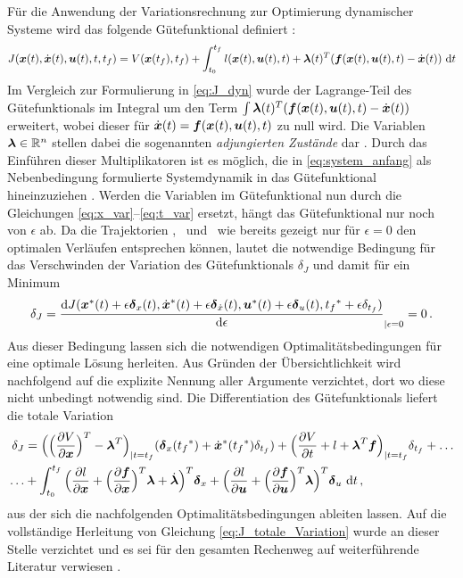 Für die Anwendung der Variationsrechnung zur Optimierung dynamischer Systeme wird das folgende Gütefunktional definiert \cite{KnutGraichen.2012}:
\begin{equation}
J(\boldsymbol{x}(t),\dot{\boldsymbol{x}}(t),\boldsymbol{u}(t),t,t_f) = V(\boldsymbol{x}(t_f),t_f) + \int_{t_0}^{t_f}l(\boldsymbol{x}(t),\boldsymbol{u}(t),t) + \boldsymbol{\lambda}(t)^T(\boldsymbol{f}(\boldsymbol{x}(t),\boldsymbol{u}(t),t) - \dot{\boldsymbol{x}}(t))~\textrm{d}{t} \label{eq:J_var_sys}
\end{equation}
Im Vergleich zur Formulierung in \eqref{eq:J_dyn} wurde der Lagrange-Teil des Gütefunktionals im Integral um den Term $\int\boldsymbol{\lambda}(t)^T(\boldsymbol{f}(\boldsymbol{x}(t),\boldsymbol{u}(t),t) - \dot{\boldsymbol{x}}(t))$ erweitert, wobei dieser für $\dot{\boldsymbol{x}}(t) = \boldsymbol{f}(\boldsymbol{x}(t),\boldsymbol{u}(t),t)$ zu null wird. Die Variablen $\boldsymbol{\lambda}\in\mathbb{R}^n$ stellen dabei die sogenannten \textit{adjungierten Zustände} dar \cite{KnutGraichen.2012}. Durch das Einführen dieser Multiplikatoren ist es möglich, die in \eqref{eq:system_anfang} als Nebenbedingung formulierte Systemdynamik in das Gütefunktional hineinzuziehen \cite{Follinger.1994}. Werden die Variablen im Gütefunktional nun durch die Gleichungen \eqref{eq:x_var}--\eqref{eq:t_var} ersetzt, hängt das Gütefunktional nur noch von $\epsilon$ ab. Da die Trajektorien \xoft, \dxoft~und \uoft~wie bereits gezeigt nur für $\epsilon=0$ den optimalen Verläufen entsprechen können, lautet die notwendige Bedingung für das Verschwinden der Variation des Gütefunktionals $\delta_J$ und damit für ein Minimum 
\begin{equation}
	\delta_J = \frac{\textrm{d}J({\boldsymbol{x}}^*(t)+\epsilon\boldsymbol{\delta}_{x}(t),\dot{\boldsymbol{x}}^*(t) + \epsilon\boldsymbol{\delta}_{\dot{x}}(t),{\boldsymbol{u}}^*(t) + \epsilon\boldsymbol{\delta}_{u}(t),{t_f}^* + \epsilon\delta_{t_f})}{\textrm{d}{\epsilon}}_{|\epsilon=0}=0\,. \label{eq:VariationJ}
\end{equation}
Aus dieser Bedingung lassen sich die notwendigen Optimalitätsbedingungen für eine optimale Lösung herleiten. Aus Gründen der Übersichtlichkeit wird nachfolgend auf die explizite Nennung aller Argumente verzichtet, dort wo diese nicht unbedingt notwendig sind. Die Differentiation des Gütefunktionals liefert die totale Variation \cite{KnutGraichen.2012}
\begin{equation}
\begin{split}
\delta_J &=  \Big(\Big(\frac{\partial V}{\partial \boldsymbol{x}}\Big)^T - \boldsymbol{\lambda}^T\Big)_{|t=t_f}(\boldsymbol{\delta}_{x}({t_f}^*)+\dot{\boldsymbol{x}}^*({t_f}^*)\delta_{t_f}) + \Big(\frac{\partial V}{\partial t} + l + \boldsymbol{\lambda}^T\boldsymbol{f}\Big)_{|t=t_f}\delta_{t_f} + \dots\\
\dots& + \int_{t_0}^{t_f} \Big(\frac{\partial l}{\partial \boldsymbol{x}} + \Big(\frac{\partial \boldsymbol{f}}{\partial \boldsymbol{x}}\Big)^T \boldsymbol{\lambda} + \dot{\boldsymbol{\lambda}}\Big)^T \boldsymbol{\delta}_{x} + \Big(\frac{\partial l}{\partial \boldsymbol{u}} + \Big(\frac{\partial \boldsymbol{f}}{\partial \boldsymbol{u}}\Big)^T \boldsymbol{\lambda}\Big)^T \boldsymbol{\delta}_{u} ~\textrm{d}{t}\,, \label{eq:J_totale_Variation}
\end{split}
\end{equation}
aus der sich die nachfolgenden Optimalitätsbedingungen ableiten lassen. Auf die vollständige Herleitung von Gleichung \eqref{eq:J_totale_Variation} wurde an dieser Stelle verzichtet und es sei für den gesamten Rechenweg auf weiterführende Literatur verwiesen \cite{KnutGraichen.2012,Papageorgiou.2012,Gerdts.2010}.
